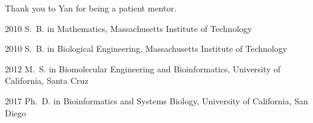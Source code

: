 \begin{frontmatter}
%
%
\begin{acknowledgements}
 Thank you to Yan for being a patient mentor.
\end{acknowledgements}


%
%
\begin{vitapage}
\begin{vita}
  \item[2010] S.~B. in Mathematics, Massachusetts Institute of Technology
  \item[2010] S.~B. in Biological Engineering, Massachusetts Institute of Technology
  \item[2012] M.~S. in Biomolecular Engineering and Bioinformatics, University of California, Santa Cruz
  \item[2017] Ph.~D. in Bioinformatics and Systems Biology, University of California, San Diego
\end{vita}


\end{vitapage}
\end{frontmatter}
